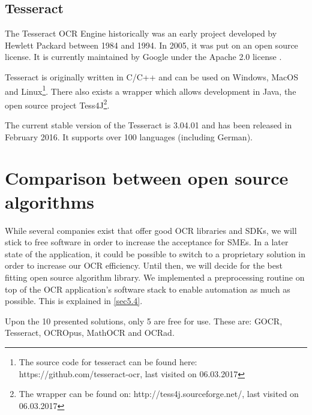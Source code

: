\label{Tesseract}
\subsection{Tesseract}
The Tesseract OCR Engine historically was an early project developed by Hewlett Packard between 1984 and 1994. In 2005, it was put on an open source license. It is currently maintained by Google under the Apache 2.0 license \cite{smith07}.

Tesseract is originally written in C/C++ and can be used on Windows, MacOS and Linux\footnote{The source code for tesseract can be found here: https://github.com/tesseract-ocr, last visited on 06.03.2017}. There also exists a wrapper which allows development in Java, the open source project Tess4J\footnote{The wrapper can be found on: http://tess4j.sourceforge.net/, last visited on 06.03.2017}.

The current stable version of the Tesseract is 3.04.01 and has been released in February 2016. It supports over 100 languages (including German). 

\section{Comparison between open source algorithms}
\label{sec3.2}
While several companies exist that offer good OCR libraries and SDKs, we will stick to free software in order to increase the acceptance for SMEs. In a later state of the application, it could be possible to switch to a proprietary solution in order to increase our OCR efficiency. Until then, we will decide for the best fitting open source algorithm library. We implemented a preprocessing routine on top of the OCR application's software stack to enable automation as much as possible. This is explained in \ref{sec5.4}.

Upon the 10 presented solutions, only 5 are free for use. These are: GOCR, Tesseract, OCROpus, MathOCR and OCRad.

